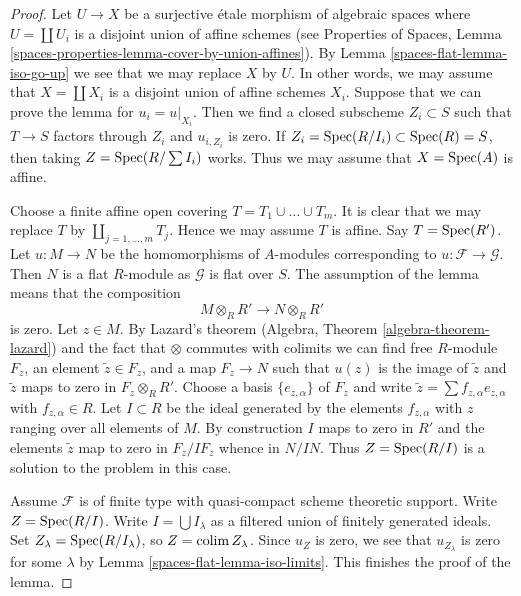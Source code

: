 \begin{proof}
Let $U \to X$ be a surjective \'etale morphism of algebraic spaces
where $U = \coprod U_i$ is a disjoint union of affine schemes (see
Properties of Spaces, Lemma
\ref{spaces-properties-lemma-cover-by-union-affines}).
By Lemma \ref{spaces-flat-lemma-iso-go-up} we see that we may
replace $X$ by $U$. In other words, we may assume that $X = \coprod X_i$
is a disjoint union of affine schemes $X_i$. Suppose that we can prove
the lemma for $u_i = u|_{X_i}$. Then we find a closed subscheme
$Z_i \subset S$ such that $T \to S$ factors through $Z_i$ and
$u_{i, Z_i}$ is zero. If
$Z_i = \operatorname{Spec}(R/I_i) \subset \operatorname{Spec}(R) = S$, then taking
$Z = \operatorname{Spec}(R/\sum I_i)$ works. Thus we may assume that
$X = \operatorname{Spec}(A)$ is affine.

\medskip\noindent
Choose a finite affine open covering $T = T_1 \cup \ldots \cup T_m$.
It is clear that we may replace $T$ by $\coprod_{j = 1, \ldots, m} T_j$.
Hence we may assume $T$ is affine. Say $T = \operatorname{Spec}(R')$.
Let $u : M \to N$ be the homomorphisms of $A$-modules
corresponding to $u : \mathcal{F} \to \mathcal{G}$.
Then $N$ is a flat $R$-module as $\mathcal{G}$ is flat over $S$.
The assumption of the lemma means that the composition
$$
M \otimes_R R' \to N \otimes_R R'
$$
is zero. Let $z \in M$. By Lazard's theorem
(Algebra, Theorem \ref{algebra-theorem-lazard}) and the fact
that $\otimes$ commutes with colimits we can find free $R$-module
$F_z$, an element $\tilde z \in F_z$, and a map $F_z \to N$ such that
$u(z)$ is the image of $\tilde z$ and $\tilde z$ maps to zero in
$F_z \otimes_R R'$. Choose a basis $\{e_{z, \alpha}\}$ of $F_z$ and write
$\tilde z = \sum f_{z, \alpha} e_{z, \alpha}$ with $f_{z, \alpha} \in R$.
Let $I \subset R$ be the ideal generated by the elements $f_{z, \alpha}$
with $z$ ranging over all elements of $M$.
By construction $I$ maps to zero in $R'$ and the elements $\tilde z$
map to zero in $F_z/IF_z$ whence in $N/IN$. Thus $Z = \operatorname{Spec}(R/I)$
is a solution to the problem in this case.

\medskip\noindent
Assume $\mathcal{F}$ is of finite type with quasi-compact scheme
theoretic support. Write $Z = \operatorname{Spec}(R/I)$.
Write $I = \bigcup I_\lambda$ as a filtered union of finitely generated
ideals. Set $Z_\lambda = \operatorname{Spec}(R/I_\lambda)$, so $Z = \operatorname{colim} Z_\lambda$.
Since $u_Z$ is zero, we see that $u_{Z_\lambda}$ is zero
for some $\lambda$ by Lemma \ref{spaces-flat-lemma-iso-limits}.
This finishes the proof of the lemma.
\end{proof}

